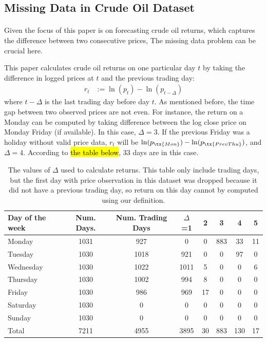\documentclass[12pt]{article}
\begin{document}
	
	\subsection{Missing Data in Crude Oil Dataset}
	\paragraph{} Given the focus of this paper is on forecasting crude oil returns, which captures the difference between two consecutive prices, The missing data problem can be crucial here.

	\par This paper calculates crude oil returns on one particular day $t$ by taking the difference in logged prices at $t$ and the previous trading day:
	\begin{align}
		r_t &:= \ln(p_t) - \ln(p_{t - \Delta})
	\end{align}
	where $t - \Delta$ is the last trading day before day $t$. As mentioned before, the time gap between two observed prices are not even. For instance, the return on a Monday can be computed by taking difference between the log close price on Monday Friday (if available). In this case, $\Delta = 3$. If the previous Friday was a holiday without valid price data, $r_t$ will be $\ln(p_\tx{Mon}) - \ln(p_{\tx{Prev Thu}})$, and $\Delta = 4$. According to \hl{the table below}, 33 days are in this case.
	\begin{table}[H]
		\center
		\small
		\begin{tabular}{|l|c c c c c c c|}
			\hline
			Day of the week & Num. Days. & Num. Trading Days & $\Delta$=1 & 2 & 3 & 4 & 5 \\
			\hline
			Monday & 1031 & 927 & 0 & 0 & 883 & 33 & 11 \\
			Tuesday & 1030 & 1018 & 921 & 0 & 0 & 97 & 0 \\
			Wednesday & 1030 & 1022 & 1011 & 5 & 0 & 0 & 6 \\
			Thursday & 1030 & 1002 & 994 & 8 & 0 & 0 & 0 \\
			Friday & 1030 & 986 & 969 & 17 & 0 & 0 & 0 \\
			Saturday & 1030 & 0 & 0 & 0 & 0 & 0 & 0 \\
			Sunday & 1030 & 0 & 0 & 0 & 0 & 0 & 0 \\
			\hline
			Total & 7211 & 4955 & 3895 & 30 & 883 & 130 & 17 \\
			\hline
		\end{tabular}
		\caption{The values of $\Delta$ used to calculate returns. This table only include trading days, but the first day with price observation in this dataset was dropped because it did not have a previous trading day, so return on this day cannot by computed using our definition.}
	\end{table}
\end{document}
